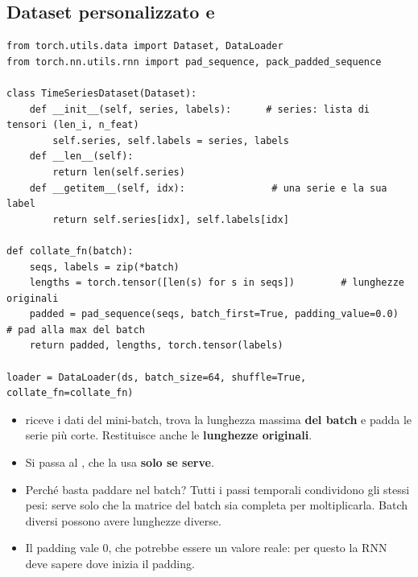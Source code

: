 \subsection{Dataset personalizzato e }
\begin{lstlisting}
from torch.utils.data import Dataset, DataLoader
from torch.nn.utils.rnn import pad_sequence, pack_padded_sequence

class TimeSeriesDataset(Dataset):
    def __init__(self, series, labels):      # series: lista di tensori (len_i, n_feat)
        self.series, self.labels = series, labels
    def __len__(self):
        return len(self.series)
    def __getitem__(self, idx):               # una serie e la sua label
        return self.series[idx], self.labels[idx]

def collate_fn(batch):
    seqs, labels = zip(*batch)
    lengths = torch.tensor([len(s) for s in seqs])        # lunghezze originali
    padded = pad_sequence(seqs, batch_first=True, padding_value=0.0)  # pad alla max del batch
    return padded, lengths, torch.tensor(labels)

loader = DataLoader(ds, batch_size=64, shuffle=True, collate_fn=collate_fn)
\end{lstlisting}
\begin{itemize}
  \item {} riceve i dati del mini-batch, trova la lunghezza massima \textbf{del batch} e padda le serie più corte.
        Restituisce anche le \textbf{lunghezze originali}.
  \item Si passa al , che la usa \textbf{solo se serve}.
  \item Perché basta paddare nel batch? Tutti i passi temporali condividono gli stessi pesi: serve solo che la matrice del batch sia
        completa per moltiplicarla. Batch diversi possono avere lunghezze diverse.
  \item Il padding vale 0, che potrebbe essere un valore reale: per questo la RNN deve sapere dove inizia il padding.
\end{itemize}

